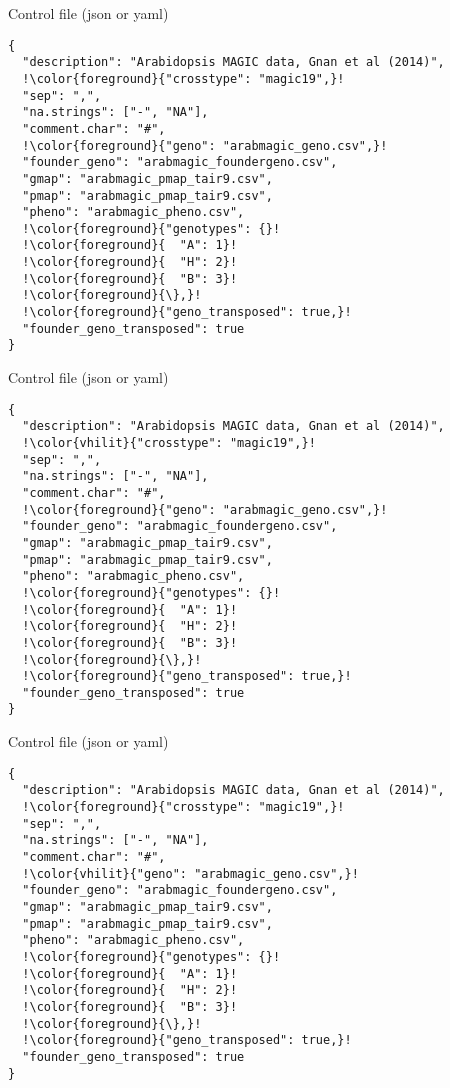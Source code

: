 \documentclass[12pt,t,aspectratio=169]{beamer}
\begin{document}
\begin{frame}[c,fragile]{Control file (json or yaml)}
\begin{semiverbatim} \begin{lstlisting}[escapechar=!,]
{
  "description": "Arabidopsis MAGIC data, Gnan et al (2014)",
  !\color{foreground}{"crosstype": "magic19",}!
  "sep": ",",
  "na.strings": ["-", "NA"],
  "comment.char": "#",
  !\color{foreground}{"geno": "arabmagic_geno.csv",}!
  "founder_geno": "arabmagic_foundergeno.csv",
  "gmap": "arabmagic_pmap_tair9.csv",
  "pmap": "arabmagic_pmap_tair9.csv",
  "pheno": "arabmagic_pheno.csv",
  !\color{foreground}{"genotypes": {}!
  !\color{foreground}{  "A": 1}!
  !\color{foreground}{  "H": 2}!
  !\color{foreground}{  "B": 3}!
  !\color{foreground}{\},}!
  !\color{foreground}{"geno_transposed": true,}!
  "founder_geno_transposed": true
}
\end{lstlisting} \end{semiverbatim}
\end{frame}


\begin{frame}[c,fragile]{Control file (json or yaml)}
\addtocounter{framenumber}{-1}
\begin{semiverbatim} \begin{lstlisting}[escapechar=!]
{
  "description": "Arabidopsis MAGIC data, Gnan et al (2014)",
  !\color{vhilit}{"crosstype": "magic19",}!
  "sep": ",",
  "na.strings": ["-", "NA"],
  "comment.char": "#",
  !\color{foreground}{"geno": "arabmagic_geno.csv",}!
  "founder_geno": "arabmagic_foundergeno.csv",
  "gmap": "arabmagic_pmap_tair9.csv",
  "pmap": "arabmagic_pmap_tair9.csv",
  "pheno": "arabmagic_pheno.csv",
  !\color{foreground}{"genotypes": {}!
  !\color{foreground}{  "A": 1}!
  !\color{foreground}{  "H": 2}!
  !\color{foreground}{  "B": 3}!
  !\color{foreground}{\},}!
  !\color{foreground}{"geno_transposed": true,}!
  "founder_geno_transposed": true
}
\end{lstlisting} \end{semiverbatim}
\end{frame}



\begin{frame}[c,fragile]{Control file (json or yaml)}
\addtocounter{framenumber}{-1}
\begin{semiverbatim} \begin{lstlisting}[escapechar=!]
{
  "description": "Arabidopsis MAGIC data, Gnan et al (2014)",
  !\color{foreground}{"crosstype": "magic19",}!
  "sep": ",",
  "na.strings": ["-", "NA"],
  "comment.char": "#",
  !\color{vhilit}{"geno": "arabmagic_geno.csv",}!
  "founder_geno": "arabmagic_foundergeno.csv",
  "gmap": "arabmagic_pmap_tair9.csv",
  "pmap": "arabmagic_pmap_tair9.csv",
  "pheno": "arabmagic_pheno.csv",
  !\color{foreground}{"genotypes": {}!
  !\color{foreground}{  "A": 1}!
  !\color{foreground}{  "H": 2}!
  !\color{foreground}{  "B": 3}!
  !\color{foreground}{\},}!
  !\color{foreground}{"geno_transposed": true,}!
  "founder_geno_transposed": true
}
\end{lstlisting} \end{semiverbatim}
\end{frame}
\end{document}

